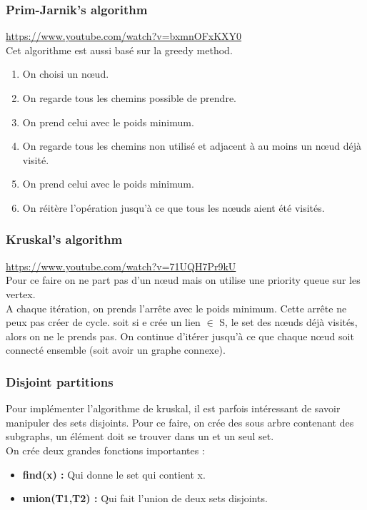 \documentclass[a4paper]{article}
\begin{document}
\subsubsection{Prim-Jarnik's algorithm}
\url{https://www.youtube.com/watch?v=bxmnOFxKXY0}\\
Cet algorithme est aussi basé sur la greedy method.
\begin{enumerate}
\item On choisi un nœud.
\item On regarde tous les chemins possible de prendre.
\item On prend celui avec le poids minimum.
\item On regarde tous les chemins non utilisé et adjacent à au moins un nœud déjà visité.
\item On prend celui avec le poids minimum.
\item On réitère l'opération jusqu'à ce que tous les nœuds aient été visités.
\end{enumerate}

\subsubsection{Kruskal's algorithm}
\url{https://www.youtube.com/watch?v=71UQH7Pr9kU}\\
Pour ce faire on ne part pas d'un nœud mais on utilise une priority queue sur les vertex.\\
A chaque itération, on prends l'arrête avec le poids minimum. Cette arrête ne peux pas créer de cycle. soit si e crée un lien $\in$ S, le set des nœuds déjà visités, alors on ne le prends pas. On continue d'itérer jusqu'à ce que chaque nœud soit connecté ensemble (soit avoir un graphe connexe).
\subsubsection*{Disjoint partitions}
Pour implémenter l'algorithme de kruskal, il est parfois intéressant de savoir manipuler des sets disjoints. Pour ce faire, on crée des sous arbre contenant des subgraphs, un élément doit se trouver dans un et un seul set.\\
On crée deux grandes fonctions importantes :
\begin{itemize}
\item \textbf{find(x) :} Qui donne le set qui contient x.
\item \textbf{union(T1,T2) :} Qui fait l'union de deux sets disjoints.
\end{itemize}
\end{document}
